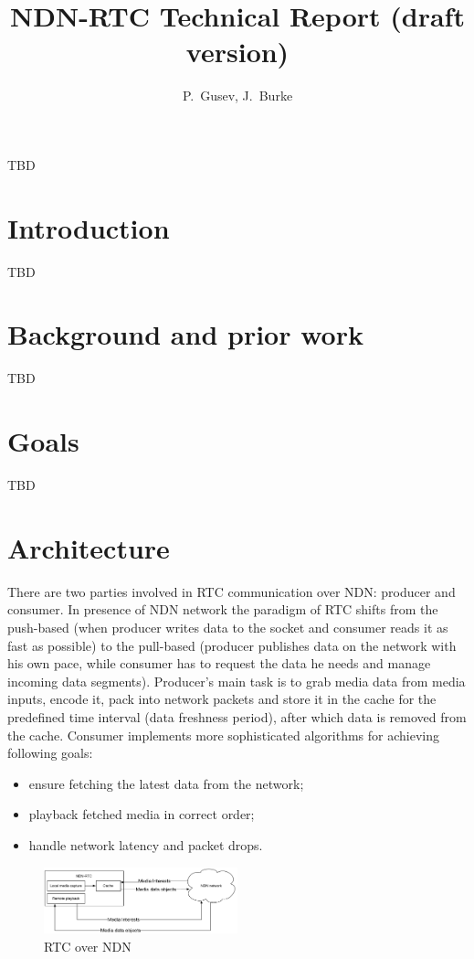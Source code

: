 \documentclass[10pt]{proc}
\author{P.~Gusev, J.~Burke}
\title{NDN-RTC Technical Report (draft version)}
\begin{document}
\maketitle

\abstract
TBD

\section{Introduction}
TBD

\section{Background and prior work}
TBD

\section{Goals}
TBD

\section{Architecture}
There are two parties involved in RTC communication over NDN: producer and consumer. In presence of NDN network the paradigm of RTC shifts from the push-based (when producer writes data to the socket and consumer reads it as fast as possible) to the pull-based (producer publishes data on the network with his own pace, while consumer has to request the data he needs and manage incoming data segments).
Producer's main task is to grab media data from media inputs, encode it, pack into network packets and store it in the cache for the predefined time interval (data freshness period), after which data is removed from the cache.
Consumer implements more sophisticated algorithms for achieving following goals:
\begin{itemize}
\item ensure fetching the latest data from the network; 
\item playback fetched media in correct order;
\item handle network latency and packet drops.
\end{itemize}

\begin{figure}[Ht!]
\centering
\includegraphics[width=0.5\textwidth]{architecture}
\caption{RTC over NDN}
\label{fig:arc}
\end{figure}
\end{document}
